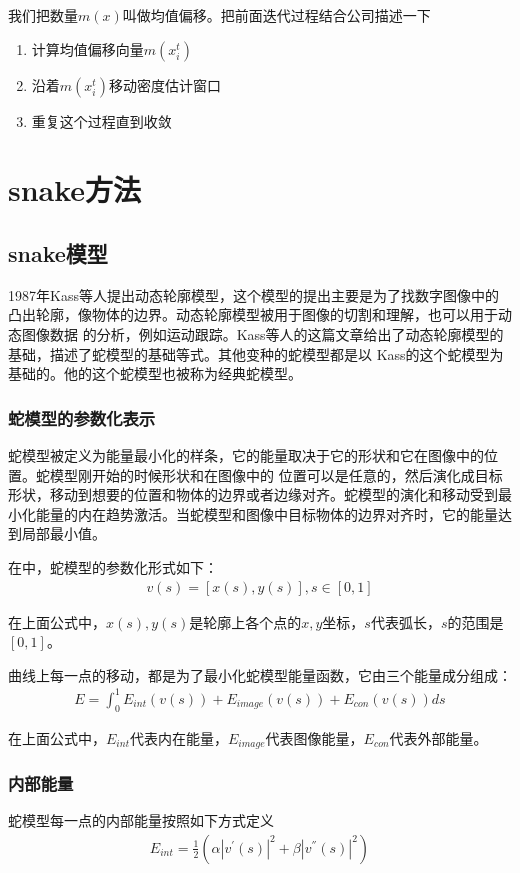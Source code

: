 我们把数量$m(x)$叫做均值偏移。把前面迭代过程结合公司描述一下
\begin{enumerate}
  \item 计算均值偏移向量$m(x_{i}^{t}) $
  \item 沿着$m(x_{i}^t)$移动密度估计窗口
  \item 重复这个过程直到收敛
\end{enumerate}
\section{snake方法}
\subsection{snake模型}
1987年Kass等人提出动态轮廓模型\cite{kass1988snakes}，这个模型的提出主要是为了找数字图像中的
凸出轮廓，像物体的边界。动态轮廓模型被用于图像的切割和理解，也可以用于动态图像数据
的分析，例如运动跟踪。Kass等人\cite{kass1988snakes}的这篇文章给出了动态轮廓模型的基础，描述了蛇模型的基础等式。其他变种的蛇模型都是以
Kass的这个蛇模型为基础的。他的这个蛇模型也被称为经典蛇模型。
\subsubsection{蛇模型的参数化表示}
蛇模型被定义为能量最小化的样条，它的能量取决于它的形状和它在图像中的位置。蛇模型刚开始的时候形状和在图像中的
位置可以是任意的，然后演化成目标形状，移动到想要的位置和物体的边界或者边缘对齐。蛇模型的演化和移动受到最小化能量的内在趋势激活。当蛇模型和图像中目标物体的边界对齐时，它的能量达到局部最小值。

在\cite{kass1988snakes}中，蛇模型的参数化形式如下：
\begin{align}\label{eq:base_snake_parameter_representation}
	v(s) = [x(s),y(s)],s \in [0,1]
\end{align}

在上面公式中，$x(s),y(s)$是轮廓上各个点的$x,y$坐标，$s$代表弧长，$s$的范围是$[0,1]$。

曲线上每一点的移动，都是为了最小化蛇模型能量函数，它由三个能量成分组成：
\begin{align}\label{eq:base_snake_calculative_representation}
	E = \int_0^1E_{int}(v(s))+E_{image}(v(s))+E_{con}(v(s)) ds
\end{align}

在上面公式中，$E_{int}$代表内在能量，$E_{image}$代表图像能量，$E_{con}$代表外部能量。

\subsubsection{内部能量}
蛇模型每一点的内部能量按照如下方式定义
\begin{align}\label{eq:base_snake_calculative_internal_representation}
	E_{int} = \frac{1}{2}(\alpha|v^{'}(s)|^{2}+\beta|v^{''}(s)|^{2})
\end{align}

